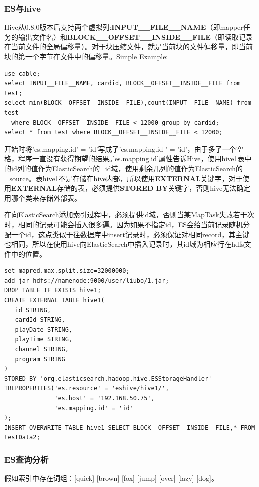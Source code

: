 \subsubsection{ES与hive}
\par Hive从0.8.0版本后支持两个虚拟列:\textbf{INPUT\_\_FILE\_\_NAME}（即mapper任务的输出文件名）和\textbf{BLOCK\_\_OFFSET\_\_INSIDE\_\_FILE}（即读取记录在当前文件的全局偏移量）。对于块压缩文件，就是当前块的文件偏移量，即当前块的第一个字节在文件中的偏移量。Simple Example:
\begin{verbatim}
use cable;
select INPUT__FILE__NAME, cardid, BLOCK__OFFSET__INSIDE__FILE from test;
select min(BLOCK__OFFSET__INSIDE__FILE),count(INPUT__FILE__NAME) from test
  where BLOCK__OFFSET__INSIDE__FILE < 12000 group by cardid;
select * from test where BLOCK__OFFSET__INSIDE__FILE < 12000;
\end{verbatim}
\par 开始时将'es.mapping.id' = 'id'写成了'es.mapping.id ' = 'id'，由于多了一个空格，程序一直没有获得期望的结果。'es.mapping.id'属性告诉Hive，使用hive1表中的id列的值作为ElasticSearch的\_id域，使用剩余几列的值作为ElasticSearch的\_source。表hive1不是存储在hive内部，所以使用\textbf{EXTERNAL}关键字，对于使用\textbf{EXTERNAL}存储的表，必须提供\textbf{STORED BY}关键字，否则hive无法确定用哪个类来存储外部表。
\par 在向ElasticSearch添加索引过程中，必须提供id域，否则当某MapTask失败若干次时，相同的记录可能会插入很多遍。因为如果不指定id，ES会给当前记录随机分配一个id，这点类似于往数据库中insert记录时，必须保证对相同record，其主键也相同，所以在使用hive向ElasticSearch中插入记录时，其id域为相应行在hdfs文件中的位置。
\begin{verbatim}
set mapred.max.split.size=32000000;
add jar hdfs://namenode:9000/user/liubo/1.jar;
DROP TABLE IF EXISTS hive1;
CREATE EXTERNAL TABLE hive1(
   id STRING,
   cardId STRING, 
   playDate STRING, 
   playTime STRING,
   channel STRING, 
   program STRING
)
STORED BY 'org.elasticsearch.hadoop.hive.ESStorageHandler'
TBLPROPERTIES('es.resource' = 'eshive/hive1/',
              'es.host' = '192.168.50.75',
              'es.mapping.id' = 'id'
);
INSERT OVERWRITE TABLE hive1 SELECT BLOCK__OFFSET__INSIDE__FILE,* FROM testData2;
\end{verbatim}
\subsubsection{ES查询分析}
\par 假如索引中存在词组：[quick] [brown] [fox] [jump] [over] [lazy] [dog]。

